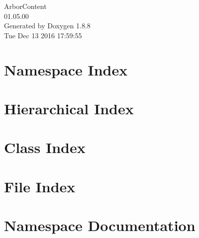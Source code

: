 \documentclass[twoside]{book}
\newcommand{\+}{\discretionary{\mbox{\scriptsize$\hookleftarrow$}}{}{}}
\newcommand{\clearemptydoublepage}{%
  \newpage{\pagestyle{empty}\cleardoublepage}%
}
\begin{document}
\begin{titlepage}
\vspace*{7cm}
\begin{center}%
{\Large Arbor\+Content \\[1ex]\large 01.\+05.\+00 }\\
\vspace*{1cm}
{\large Generated by Doxygen 1.8.8}\\
\vspace*{0.5cm}
{\small Tue Dec 13 2016 17:59:55}\\
\end{center}
\end{titlepage}
\clearemptydoublepage
\tableofcontents
\clearemptydoublepage
{}

\chapter{Namespace Index}

\chapter{Hierarchical Index}

\chapter{Class Index}

\chapter{File Index}

\chapter{Namespace Documentation}


\end{document}
